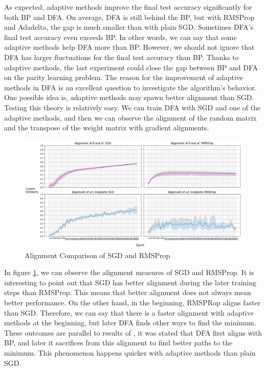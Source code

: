 \documentclass[a4paper, nobind]{templates/ociamthesis}
\begin{document}
\noindent As expected, adaptive methods improve the final test accuracy significantly for both BP and DFA. On average, DFA is still behind the BP, but with RMSProp and Adadelta, the gap is much smaller than with plain SGD. Sometimes DFA's final test accuracy even exceeds BP. In other words, we can say that some adaptive methods help DFA more than BP. However, we should not ignore that DFA has larger fluctuations for the final test accuracy than BP. Thanks to adaptive methods, the last experiment could close the gap between BP and DFA on the parity learning problem.
\noindent The reason for the improvement of adaptive methods in DFA is an excellent question to investigate the algorithm's behavior. One possible idea is, adaptive methods may spawn better alignment than SGD. Testing this theory is relatively easy. We can train DFA with SGD and one of the adaptive methods, and then we can observe the alignment of the random matrix and the transpose of the weight matrix with gradient alignments.

\begin{figure}

{\centering \includegraphics[width=1\linewidth]{figures/3_k3_SGD_Adadelta_DFA_Alingment} 

}

\caption{Alignment Comparison of SGD and RMSProp}\label{fig:Alignment}
\end{figure}

\noindent In figure \ref{fig:Alignment}, we can observe the alignment measures of SGD and RMSProp. It is interesting to point out that SGD has better alignment during the later training steps than RMSProp. This means that better alignment does not always mean better performance. On the other hand, in the beginning, RMSPRop aligns faster than SGD. Therefore, we can say that there is a faster alignment with adaptive methods at the beginning, but later DFA finds other ways to find the minimum. These outcomes are parallel to results of \cite{refinetti2021align}, it was stated that DFA first aligns with BP, and later it sacrifices from this alignment to find better paths to the minimum. This phenomenon happens quicker with adaptive methods than plain SGD.
\end{document}

